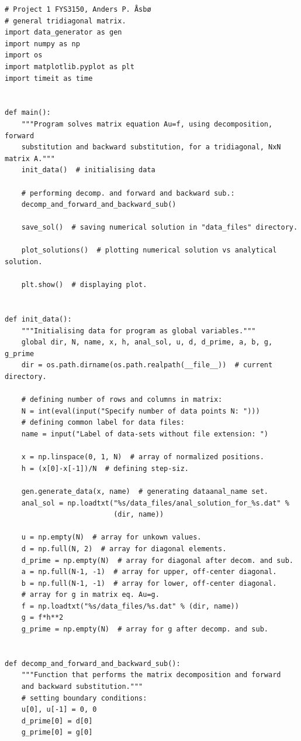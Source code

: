 \documentclass[english,notitlepage]{revtex4-1}  %
\begin{document}
\begin{lstlisting}
# Project 1 FYS3150, Anders P. Åsbø
# general tridiagonal matrix.
import data_generator as gen
import numpy as np
import os
import matplotlib.pyplot as plt
import timeit as time


def main():
    """Program solves matrix equation Au=f, using decomposition, forward
    substitution and backward substitution, for a tridiagonal, NxN matrix A."""
    init_data()  # initialising data

    # performing decomp. and forward and backward sub.:
    decomp_and_forward_and_backward_sub()

    save_sol()  # saving numerical solution in "data_files" directory.

    plot_solutions()  # plotting numerical solution vs analytical solution.

    plt.show()  # displaying plot.


def init_data():
    """Initialising data for program as global variables."""
    global dir, N, name, x, h, anal_sol, u, d, d_prime, a, b, g, g_prime
    dir = os.path.dirname(os.path.realpath(__file__))  # current directory.

    # defining number of rows and columns in matrix:
    N = int(eval(input("Specify number of data points N: ")))
    # defining common label for data files:
    name = input("Label of data-sets without file extension: ")

    x = np.linspace(0, 1, N)  # array of normalized positions.
    h = (x[0]-x[-1])/N  # defining step-siz.

    gen.generate_data(x, name)  # generating dataanal_name set.
    anal_sol = np.loadtxt("%s/data_files/anal_solution_for_%s.dat" %
                          (dir, name))

    u = np.empty(N)  # array for unkown values.
    d = np.full(N, 2)  # array for diagonal elements.
    d_prime = np.empty(N)  # array for diagonal after decom. and sub.
    a = np.full(N-1, -1)  # array for upper, off-center diagonal.
    b = np.full(N-1, -1)  # array for lower, off-center diagonal.
    # array for g in matrix eq. Au=g.
    f = np.loadtxt("%s/data_files/%s.dat" % (dir, name))
    g = f*h**2
    g_prime = np.empty(N)  # array for g after decomp. and sub.


def decomp_and_forward_and_backward_sub():
    """Function that performs the matrix decomposition and forward
    and backward substitution."""
    # setting boundary conditions:
    u[0], u[-1] = 0, 0
    d_prime[0] = d[0]
    g_prime[0] = g[0]


\end{lstlisting}
\end{document}
